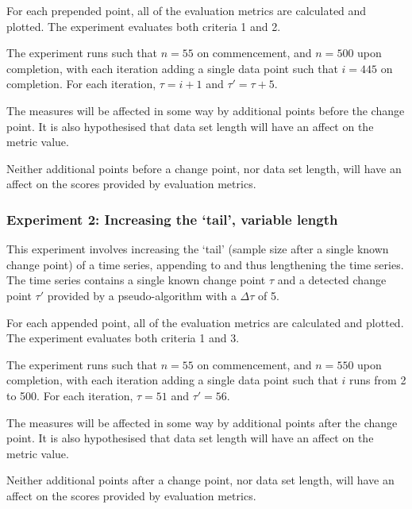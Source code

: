 \documentclass[../main.tex]{subfiles}
\begin{document}
For each prepended point, all of the evaluation metrics are calculated and plotted. The experiment evaluates both criteria 1 and 2.

The experiment runs such that $n = 55$ on commencement, and $n = 500$ upon completion, with each iteration adding a single data point such that $i = 445$ on completion. For each iteration, $\tau = i + 1$ and $\tau' = \tau + 5$.

\begin{hypothesis}
    The measures will be affected in some way by additional points before the change point. It is also hypothesised that data set length will have an affect on the metric value.
\end{hypothesis}

\begin{nullhypothesis}
    Neither additional points before a change point, nor data set length, will have an affect on the scores provided by evaluation metrics.
\end{nullhypothesis}

\subsubsection{Experiment 2: Increasing the `tail', variable length}

This experiment involves increasing the `tail' (sample size after a single known change point) of a time series, appending to and thus lengthening the time series. The time series contains a single known change point $\tau$ and a detected change point $\tau'$ provided by a pseudo-algorithm with a $\Delta \tau$ of 5.

For each appended point, all of the evaluation metrics are calculated and plotted. The experiment evaluates both criteria 1 and 3.

The experiment runs such that $n=55$ on commencement, and $n=550$ upon completion, with each iteration adding a single data point such that $i$ runs from 2 to 500. For each iteration, $\tau = 51$ and $\tau' = 56$.

\begin{hypothesis}
    The measures will be affected in some way by additional points after the change point. It is also hypothesised that data set length will have an affect on the metric value.
\end{hypothesis}

\begin{nullhypothesis}
    Neither additional points after a change point, nor data set length, will have an affect on the scores provided by evaluation metrics.
\end{nullhypothesis}
\end{document}
